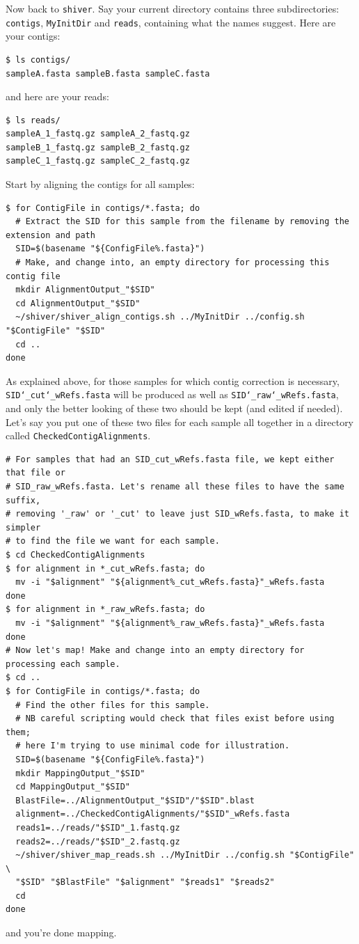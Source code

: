 \documentclass{article}
\newcommand{\shiv}{\c{shiver}\xspace}
\let\c\texttt
\begin{document}
Now back to \shiv.
Say your current directory contains three subdirectories: \c{contigs}, \c{MyInitDir} and \c{reads}, containing what the names suggest.
Here are your contigs:
\begin{Verbatim}[samepage=true]
$ ls contigs/
sampleA.fasta sampleB.fasta sampleC.fasta
\end{Verbatim}
and here are your reads:
\begin{Verbatim}[samepage=true]
$ ls reads/
sampleA_1_fastq.gz sampleA_2_fastq.gz  
sampleB_1_fastq.gz sampleB_2_fastq.gz  
sampleC_1_fastq.gz sampleC_2_fastq.gz
\end{Verbatim}
Start by aligning the contigs for all samples:
\begin{Verbatim}[samepage=true]
$ for ContigFile in contigs/*.fasta; do  
  # Extract the SID for this sample from the filename by removing the extension and path
  SID=$(basename "${ConfigFile%.fasta}")
  # Make, and change into, an empty directory for processing this contig file
  mkdir AlignmentOutput_"$SID"  
  cd AlignmentOutput_"$SID"  
  ~/shiver/shiver_align_contigs.sh ../MyInitDir ../config.sh "$ContigFile" "$SID"
  cd ..
done
\end{Verbatim}
As explained above, for those samples for which contig correction is necessary, \c{SID\char`_cut\char`_wRefs.fasta} will be produced as well as \c{SID\char`_raw\char`_wRefs.fasta}, and only the better looking of these two should be kept (and edited if needed).
Let's say you put one of these two files for each sample all together in a directory called \c{CheckedContigAlignments}.  
\begin{Verbatim}[samepage=true]
# For samples that had an SID_cut_wRefs.fasta file, we kept either that file or
# SID_raw_wRefs.fasta. Let's rename all these files to have the same suffix,
# removing '_raw' or '_cut' to leave just SID_wRefs.fasta, to make it simpler
# to find the file we want for each sample.
$ cd CheckedContigAlignments  
$ for alignment in *_cut_wRefs.fasta; do
  mv -i "$alignment" "${alignment%_cut_wRefs.fasta}"_wRefs.fasta
done
$ for alignment in *_raw_wRefs.fasta; do
  mv -i "$alignment" "${alignment%_raw_wRefs.fasta}"_wRefs.fasta
done
# Now let's map! Make and change into an empty directory for processing each sample.
$ cd ..
$ for ContigFile in contigs/*.fasta; do  
  # Find the other files for this sample.
  # NB careful scripting would check that files exist before using them;
  # here I'm trying to use minimal code for illustration.
  SID=$(basename "${ConfigFile%.fasta}")
  mkdir MappingOutput_"$SID"
  cd MappingOutput_"$SID"
  BlastFile=../AlignmentOutput_"$SID"/"$SID".blast
  alignment=../CheckedContigAlignments/"$SID"_wRefs.fasta
  reads1=../reads/"$SID"_1.fastq.gz
  reads2=../reads/"$SID"_2.fastq.gz
  ~/shiver/shiver_map_reads.sh ../MyInitDir ../config.sh "$ContigFile" \
  "$SID" "$BlastFile" "$alignment" "$reads1" "$reads2"
  cd
done
\end{Verbatim}
and you're done mapping.
\end{document}
